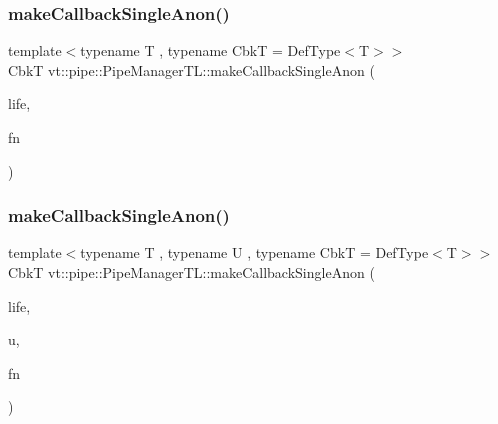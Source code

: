 \subsubsection{\texorpdfstring{make\+Callback\+Single\+Anon()}{makeCallbackSingleAnon()}\hspace{0.1cm}{\footnotesize\ttfamily [1/6]}}
{\footnotesize\ttfamily template$<$typename T , typename CbkT  = Def\+Type$<$\+T$>$$>$ \\
CbkT vt\+::pipe\+::\+Pipe\+Manager\+T\+L\+::make\+Callback\+Single\+Anon (\begin{DoxyParamCaption}\item[{\hyperlink{namespacevt_1_1pipe_acb42b284378c0fdac1d7c6335dc26f58}{Lifetime\+Enum}}]{life,  }\item[{\hyperlink{structvt_1_1pipe_1_1_pipe_manager_base_aa54eee64ab32a27777a672d49eb861f4}{Func\+Msg\+Type}$<$ T $>$}]{fn }\end{DoxyParamCaption})}

\mbox{\label{structvt_1_1pipe_1_1_pipe_manager_t_l_a59f0de1aaa6ab7ea6b0eac0667b495f7}} 
\subsubsection{\texorpdfstring{make\+Callback\+Single\+Anon()}{makeCallbackSingleAnon()}\hspace{0.1cm}{\footnotesize\ttfamily [2/6]}}
{\footnotesize\ttfamily template$<$typename T , typename U , typename CbkT  = Def\+Type$<$\+T$>$$>$ \\
CbkT vt\+::pipe\+::\+Pipe\+Manager\+T\+L\+::make\+Callback\+Single\+Anon (\begin{DoxyParamCaption}\item[{\hyperlink{namespacevt_1_1pipe_acb42b284378c0fdac1d7c6335dc26f58}{Lifetime\+Enum}}]{life,  }\item[{U $\ast$}]{u,  }\item[{\hyperlink{structvt_1_1pipe_1_1_pipe_manager_base_a73fdf82ece0411b3dc644c99b763f7a9}{Func\+Msg\+Ctx\+Type}$<$ T, U $>$}]{fn }\end{DoxyParamCaption})}

\mbox{\label{structvt_1_1pipe_1_1_pipe_manager_t_l_a4bdcd4bf9730aa312336568d005e6d01}} 
